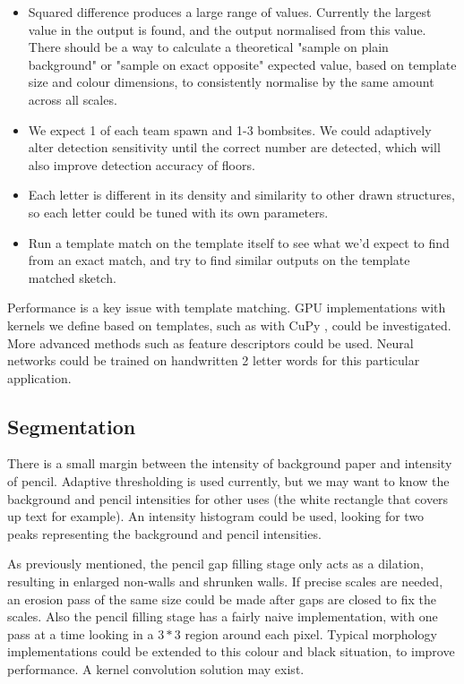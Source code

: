 \documentclass[11pt]{IEEEtran}
\begin{document}
\begin{itemize}
\item Squared difference produces a large range of values. Currently the largest value in the output is found, and the output normalised from this value. There should be a way to calculate a theoretical "sample on plain background" or "sample on exact opposite" expected value, based on template size and colour dimensions, to consistently normalise by the same amount across all scales. 
\item We expect 1 of each team spawn and 1-3 bombsites. We could adaptively alter detection sensitivity until the correct number are detected, which will also improve detection accuracy of floors. 
\item Each letter is different in its density and similarity to other drawn structures, so each letter could be tuned with its own parameters.
\item Run a template match on the template itself to see what we'd expect to find from an exact match, and try to find similar outputs on the template matched sketch.
\end{itemize}

Performance is a key issue with template matching. GPU implementations with kernels we define based on templates, such as with CuPy \cite{cupy2015user}, could be investigated. More advanced methods such as feature descriptors could be used. Neural networks could be trained on handwritten 2 letter words for this particular application.

\subsection{Segmentation}

There is a small margin between the intensity of background paper and intensity of pencil. Adaptive thresholding is used currently, but we may want to know the background and pencil intensities for other uses (the white rectangle that covers up text for example). An intensity histogram could be used, looking for two peaks representing the background and pencil intensities.

As previously mentioned, the pencil gap filling stage only acts as a dilation, resulting in enlarged non-walls and shrunken walls. If precise scales are needed, an erosion pass of the same size could be made after gaps are closed to fix the scales. Also the pencil filling stage has a fairly naive implementation, with one pass at a time looking in a $3*3$ region around each pixel. Typical morphology implementations could be extended to this colour and black situation, to improve performance. A kernel convolution solution may exist.
\end{document}

